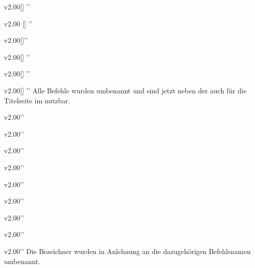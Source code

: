 \begin{Entity}{}
\begin{Obsolete}{v2.00}{[]}%
  ''
\begin{Obsolete}{v2.00}{%
  []%
}''
\begin{Obsolete}{v2.00}{[]}''
\begin{Obsolete}{v2.00}{[]}%
  ''
\begin{Obsolete}{v2.00}{[]}%
  ''
\begin{Obsolete}{v2.00}{[]}%
  ''
\printdeclarationlist%
%
Alle Befehle wurden umbenannt und sind jetzt neben der \taskname{} auch für die 
Titelseite im \CD nutzbar.
\end{Obsolete}
\end{Obsolete}
\end{Obsolete}
\end{Obsolete}
\end{Obsolete}
\end{Obsolete}

\begin{Obsolete}{v2.00}{}''
\begin{Obsolete}{v2.00}{}''
\begin{Obsolete}{v2.00}{}''
\begin{Obsolete}{v2.00}{}''
\begin{Obsolete}{v2.00}{}''
\begin{Obsolete}{v2.00}{}''
\begin{Obsolete}{v2.00}{}''
\begin{Obsolete}{v2.00}{}''
\begin{Obsolete}{v2.00}{}''
\printdeclarationlist%
%
Die Bezeichner wurden in Anlehnung an die dazugehörigen Befehlsnamen umbenannt.
\end{Obsolete}
\end{Obsolete}
\end{Obsolete}
\end{Obsolete}
\end{Obsolete}
\end{Obsolete}
\end{Obsolete}
\end{Obsolete}
\end{Obsolete}
\end{Entity}


